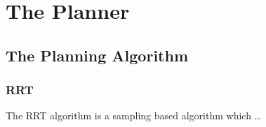 \chapter{The Planner}
\label{sec:planner}


\section{The Planning Algorithm}

\subsection{RRT}

The RRT algorithm is a sampling based algorithm which \ldots

\kant[7-11] %
